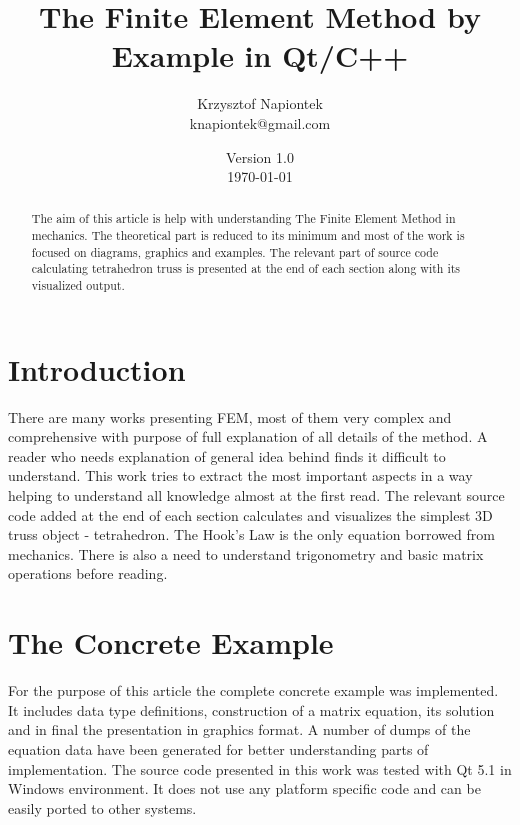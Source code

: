 


\title{The Finite Element Method by Example in Qt/C++}
\author{Krzysztof Napiontek\protect\\knapiontek@gmail.com}
\date{Version 1.0\protect\\\today}



\maketitle

\begin{abstract}

The aim of this article is help with understanding The Finite Element Method in mechanics. The theoretical part is reduced to its minimum and most of the work is focused on diagrams, graphics and examples. The relevant part of source code calculating tetrahedron truss is presented at the end of each section along with its visualized output.

\end{abstract}

\tableofcontents

\pagebreak

\section{Introduction}

There are many works presenting FEM, most of them very complex and comprehensive with purpose of full explanation of all details of the method. A reader who needs explanation of general idea behind finds it difficult to understand. This work tries to extract the most important aspects in a way helping to understand all knowledge almost at the first read. The relevant source code added at the end of each section calculates and visualizes the simplest 3D truss object - tetrahedron. The Hook's Law is the only equation borrowed from mechanics. There is also a need to understand trigonometry and basic matrix operations before reading.

\section{The Concrete Example}

For the purpose of this article the complete concrete example was implemented. It includes data type definitions, construction of a matrix equation, its solution and in final the presentation in graphics format. A number of dumps of the equation data have been generated for better understanding parts of implementation. The source code presented in this work was tested with Qt 5.1 in Windows environment. It does not use any platform specific code and can be easily ported to other systems.

